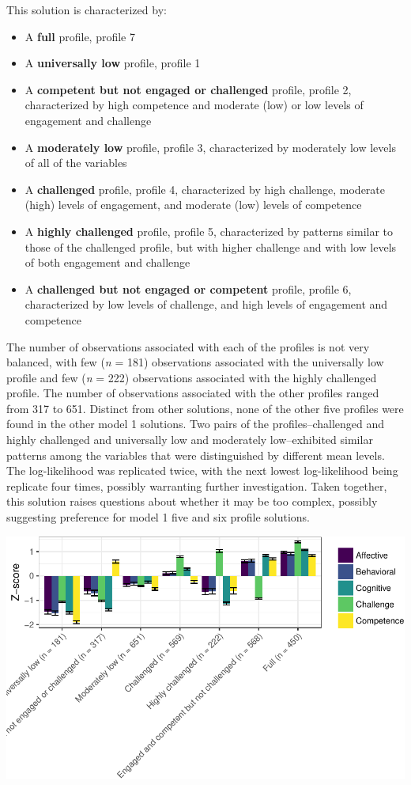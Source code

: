 \documentclass[]{book}
\providecommand{\tightlist}{%
  \setlength{\itemsep}{0pt}\setlength{\parskip}{0pt}}
\theoremstyle{definition}
\theoremstyle{definition}
\theoremstyle{definition}
\theoremstyle{remark}
\begin{document}
This solution is characterized by:

\begin{itemize}
\tightlist
\item
  A \textbf{full} profile, profile 7
\item
  A \textbf{universally low} profile, profile 1
\item
  A \textbf{competent but not engaged or challenged} profile, profile 2,
  characterized by high competence and moderate (low) or low levels of
  engagement and challenge
\item
  A \textbf{moderately low} profile, profile 3, characterized by
  moderately low levels of all of the variables
\item
  A \textbf{challenged} profile, profile 4, characterized by high
  challenge, moderate (high) levels of engagement, and moderate (low)
  levels of competence
\item
  A \textbf{highly challenged} profile, profile 5, characterized by
  patterns similar to those of the challenged profile, but with higher
  challenge and with low levels of both engagement and challenge
\item
  A \textbf{challenged but not engaged or competent} profile, profile 6,
  characterized by low levels of challenge, and high levels of
  engagement and competence
\end{itemize}

The number of observations associated with each of the profiles is not
very balanced, with few (\emph{n} = 181) observations associated with
the universally low profile and few (\emph{n} = 222) observations
associated with the highly challenged profile. The number of
observations associated with the other profiles ranged from 317 to 651.
Distinct from other solutions, none of the other five profiles were
found in the other model 1 solutions. Two pairs of the
profiles--challenged and highly challenged and universally low and
moderately low--exhibited similar patterns among the variables that were
distinguished by different mean levels. The log-likelihood was
replicated twice, with the next lowest log-likelihood being replicate
four times, possibly warranting further investigation. Taken together,
this solution raises questions about whether it may be too complex,
possibly suggesting preference for model 1 five and six profile
solutions.

\begin{center}\includegraphics[width=0.8\linewidth]{rosenberg-dissertation_files/figure-latex/m1_7p-1} \end{center}
\end{document}
